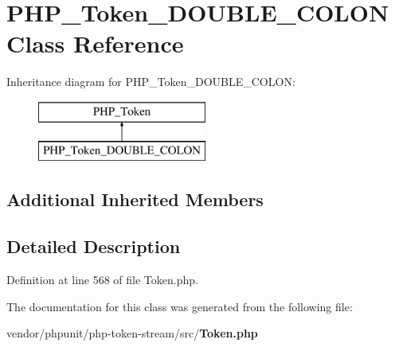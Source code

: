 \section{P\+H\+P\+\_\+\+Token\+\_\+\+D\+O\+U\+B\+L\+E\+\_\+\+C\+O\+L\+O\+N Class Reference}
\label{class_p_h_p___token___d_o_u_b_l_e___c_o_l_o_n}
Inheritance diagram for P\+H\+P\+\_\+\+Token\+\_\+\+D\+O\+U\+B\+L\+E\+\_\+\+C\+O\+L\+O\+N\+:\begin{figure}[H]
\begin{center}
\leavevmode
\includegraphics[height=2.000000cm]{class_p_h_p___token___d_o_u_b_l_e___c_o_l_o_n}
\end{center}
\end{figure}
\subsection*{Additional Inherited Members}


\subsection{Detailed Description}


Definition at line 568 of file Token.\+php.



The documentation for this class was generated from the following file\+:\begin{DoxyCompactItemize}
\item 
vendor/phpunit/php-\/token-\/stream/src/{\bf Token.\+php}\end{DoxyCompactItemize}
